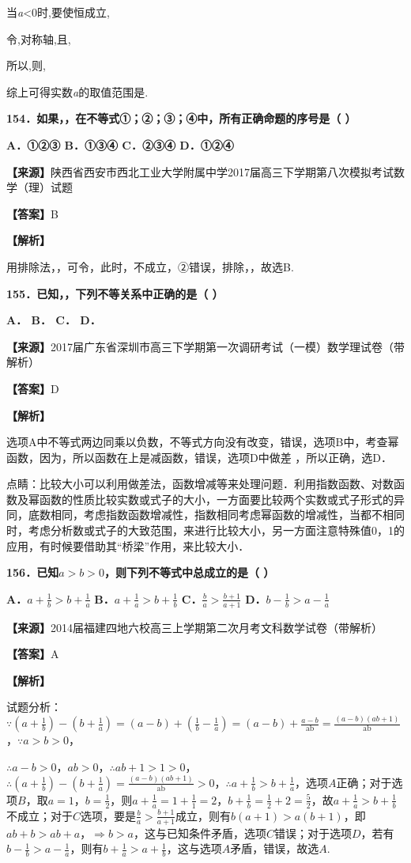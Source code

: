 当\emph{a}\textless0时,要使恒成立,

令,对称轴,且,

所以,则,

综上可得实数\emph{a}的取值范围是.

\textbf{154．如果，，在不等式①；②；③；④中，所有正确命题的序号是（ ）}

\textbf{A．①②③ B．①③④ C．②③④ D．①②④}

\textbf{【来源】}陕西省西安市西北工业大学附属中学2017届高三下学期第八次模拟考试数学（理）试题

\textbf{【答案】}B

\textbf{【解析】}

用排除法，，可令，此时，不成立，②错误，排除，，故选B.

\textbf{155．已知，，下列不等关系中正确的是（ ）}

\textbf{A． B． C． D．}

\textbf{【来源】}2017届广东省深圳市高三下学期第一次调研考试（一模）数学理试卷（带解析）

\textbf{【答案】}D

\textbf{【解析】}

选项A中不等式两边同乘以负数，不等式方向没有改变，错误，选项B中，考查幂函数，因为，所以函数在上是减函数，错误，选项D中做差
，所以正确，选D．

点睛：比较大小可以利用做差法，函数增减等来处理问题．利用指数函数、对数函数及幂函数的性质比较实数或式子的大小，一方面要比较两个实数或式子形式的异同，底数相同，考虑指数函数增减性，指数相同考虑幂函数的增减性，当都不相同时，考虑分析数或式子的大致范围，来进行比较大小，另一方面注意特殊值0，1的应用，有时候要借助其``桥梁''作用，来比较大小．

\textbf{156．已知}\(a > b > 0\)\textbf{，则下列不等式中总成立的是（ ）}

\textbf{A．}\(a + \frac{1}{b} > b + \frac{1}{a}\)
\textbf{B．}\(a + \frac{1}{a} > b + \frac{1}{b}\)
\textbf{C．}\(\frac{b}{a} > \frac{b + 1}{a + 1}\)
\textbf{D．}\(b - \frac{1}{b} > a - \frac{1}{a}\)

\textbf{【来源】}2014届福建四地六校高三上学期第二次月考文科数学试卷（带解析）

\textbf{【答案】}A

\textbf{【解析】}

试题分析：\(\because(a + \frac{1}{b}) - (b + \frac{1}{a}) = (a - b) + (\frac{1}{b} - \frac{1}{a}) = (a - b) + \frac{a - b}{\text{ab}} = \frac{(a - b)(ab + 1)}{\text{ab}}\)，\(\because a > b > 0\)，

\(\therefore a - b > 0\)，\(ab > 0\)，\(\therefore ab + 1 > 1 > 0\)，\(\therefore(a + \frac{1}{b}) - (b + \frac{1}{a}) = \frac{(a - b)(ab + 1)}{\text{ab}} > 0\)，\(\therefore a + \frac{1}{b} > b + \frac{1}{a}\)，选项\(A\)正确；对于选项\(B\)，取\(a = 1\)，\(b = \frac{1}{2}\)，则\(a + \frac{1}{a} = 1 + \frac{1}{1} = 2\)，\(b + \frac{1}{b} = \frac{1}{2} + 2 = \frac{5}{2}\)，故\(a + \frac{1}{a} > b + \frac{1}{b}\)不成立；对于\(C\)选项，要是\(\frac{b}{a} > \frac{b + 1}{a + 1}\)成立，则有\(b(a + 1) > a(b + 1)\)，即\(ab + b > ab + a\)，\(\Rightarrow b > a\)，这与已知条件矛盾，选项\(C\)错误；对于选项\(D\)，若有\(b - \frac{1}{b} > a - \frac{1}{a}\)，则有\(b + \frac{1}{a} > a + \frac{1}{b}\)，这与选项\(A\)矛盾，错误，故选\(A\).

